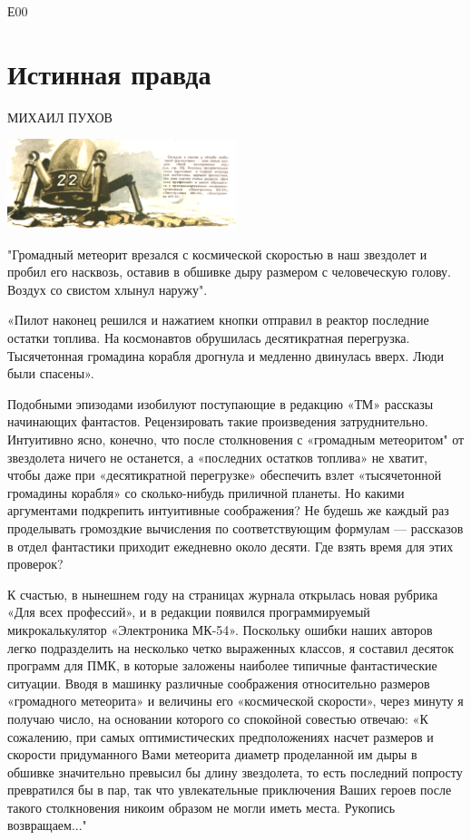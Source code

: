 \documentclass[11pt,a4paper,oneside]{article}
\begin{document}
Е00

\section{Истинная правда}
МИХАИЛ ПУХОВ

\includegraphics[width=0.5\textwidth]{real_truth}

"Громадный метеорит врезался с космической скоростью в наш звездолет и пробил его насквозь, оставив в обшивке дыру размером с человеческую голову. Воздух со свистом хлынул наружу".

«Пилот наконец решился и нажатием кнопки отправил в реактор последние остатки топлива. На космонавтов обрушилась десятикратная перегрузка. Тысячетонная громадина корабля дрогнула и медленно двинулась вверх. Люди были спасены».

Подобными эпизодами изобилуют поступающие в редакцию «ТМ» рассказы начинающих фантастов. Рецензировать такие произведения затруднительно. Интуитивно ясно, конечно, что после столкновения с «громадным метеоритом" от звездолета ничего не останется, а «последних остатков топлива» не хватит, чтобы даже при «десятикратной перегрузке» обеспечить взлет «тысячетонной громадины корабля» со сколько-нибудь приличной планеты. Но какими аргументами подкрепить интуитивные соображения? Не будешь же каждый раз проделывать громоздкие вычисления по соответствующим формулам — рассказов в отдел фантастики приходит ежедневно около десяти. Где взять время для этих проверок?

К счастью, в нынешнем году на страницах журнала открылась новая рубрика «Для всех профессий», и в редакции появился программируемый микрокалькулятор «Электроника МК-54». Поскольку ошибки наших авторов легко подразделить на несколько четко выраженных классов, я составил десяток программ для ПМК, в которые заложены наиболее типичные фантастические ситуации. Вводя в машинку различные соображения относительно размеров «громадного метеорита» и величины его «космической скорости», через минуту я получаю число, на основании которого со спокойной совестью отвечаю: «К сожалению, при самых оптимистических предположениях насчет размеров и скорости придуманного Вами метеорита диаметр проделанной им дыры в обшивке значительно превысил бы длину звездолета, то есть последний попросту превратился бы в пар, так что увлекательные приключения Ваших героев после такого столкновения никоим образом не могли иметь места. Рукопись возвращаем..."
\end{document}
